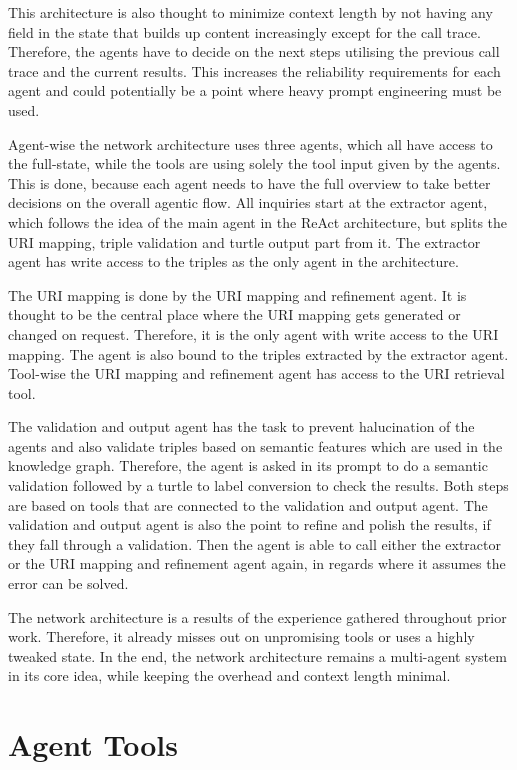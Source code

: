 \documentclass[a4paper,oneside,bibliography=totoc]{scrbook}
\begin{document}
This architecture is also thought to minimize context length by not having any field in the state that builds up content increasingly except for the call trace. Therefore, the agents have to decide on the next steps utilising the previous call trace and the current results. This increases the reliability requirements for each agent and could potentially be a point where heavy prompt engineering must be used.

Agent-wise the network architecture uses three agents, which all have access to the full-state, while the tools are using solely the tool input given by the agents. This is done, because each agent needs to have the full overview to take better decisions on the overall agentic flow. All inquiries start at the extractor agent, which follows the idea of the main agent in the ReAct architecture, but splits the URI mapping, triple validation and turtle output part from it. The extractor agent has write access to the triples as the only agent in the architecture.

The URI mapping is done by the URI mapping and refinement agent. It is thought to be the central place where the URI mapping gets generated or changed on request. Therefore, it is the only agent with write access to the URI mapping. The agent is also bound to the triples extracted by the extractor agent. Tool-wise the URI mapping and refinement agent has access to the URI retrieval tool.

The validation and output agent has the task to prevent halucination of the agents and also validate triples based on semantic features which are used in the knowledge graph. Therefore, the agent is asked in its prompt to do a semantic validation followed by a turtle to label conversion to check the results. Both steps are based on tools that are connected to the validation and output agent. The validation and output agent is also the point to refine and polish the results, if they fall through a validation. Then the agent is able to call either the extractor or the URI mapping and refinement agent again, in regards where it assumes the error can be solved.

The network architecture is a results of the experience gathered throughout prior work. Therefore, it already misses out on unpromising tools or uses a highly tweaked state. In the end, the network architecture remains a multi-agent system in its core idea, while keeping the overhead and context length minimal.

\section{Agent Tools}
\label{sec:agent_tools}
\end{document}
